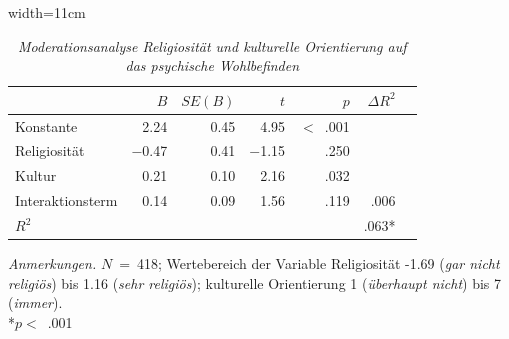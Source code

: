 \begin{table}[htb]
    \caption[Moderationsanalyse Religiosität und kulturelle Orientierung auf das psychische Wohlbefinden]{\textit {Moderationsanalyse Religiosität und kulturelle Orientierung auf das psychische Wohlbefinden}} 
    \label{Moderationsanalyse}
    \centering
    \begin{adjustbox}{width=11cm} %
    \small
    \begin{tabular}{lrrrrrr}
      \hline
                 & $B$   & $SE(B)$&  $t$    & $p$   & $\Delta R^{2}$\\
      \hline
    Konstante    & 2.24    & 0.45 & 4.95    & $<$~.001 & \\
    Religiosität & $-$0.47 & 0.41 & $-$1.15 & .250     & \\
    Kultur       & 0.21    & 0.10 & 2.16    & .032     & \\
    Interaktionsterm & 0.14 & 0.09 & 1.56   & .119     & .006 \\
    $R^{2}$          &      &      &        &          & .063* \\
       \hline
    \end{tabular}
    \end{adjustbox}
    
    \begin{tablenotes}
        \item \textit{Anmerkungen.} \(N\)~=~418; Wertebereich der Variable Religiosität -1.69 (\textit{gar nicht religiös}) bis 1.16 (\textit{sehr religiös}); kulturelle Orientierung 1 (\textit{überhaupt nicht}) bis 7 (\textit{immer}).\\ *$p<$~.001
      \end{tablenotes}
    \end{table}


